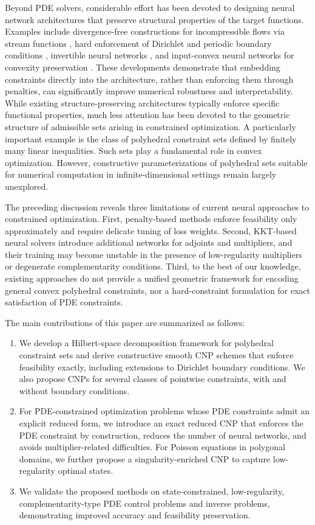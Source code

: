 \documentclass{article}
\numberwithin{equation}{section}
\begin{document}
Beyond PDE solvers, considerable effort has been devoted to designing neural network architectures that preserve structural properties of the target functions. Examples include divergence-free constructions for incompressible flows via stream functions \cite{raissi2019physics}, hard enforcement of Dirichlet and periodic boundary conditions \cite{lu2021physics}, invertible neural networks \cite{behrmann2019invertible}, and input-convex neural networks for convexity preservation \cite{amos2017input}. These developments demonstrate that embedding constraints directly into the architecture, rather than enforcing them through penalties, can significantly improve numerical robustness and interpretability. While existing structure-preserving architectures typically enforce specific functional properties, much less attention has been devoted to the geometric structure of admissible sets arising in constrained optimization. A particularly important example is the class of polyhedral constraint sets defined by finitely many linear inequalities. Such sets play a fundamental role in convex optimization. However, constructive parameterizations of polyhedral sets suitable for numerical computation in infinite-dimensional settings remain largely unexplored. 

The preceding discussion reveals three limitations of current neural approaches to constrained optimization. First, penalty-based methods enforce feasibility only approximately and require delicate tuning of loss weights. Second, KKT-based neural solvers introduce additional networks for adjoints and multipliers, and their training may become unstable in the presence of low-regularity multipliers or degenerate complementarity conditions. Third, to the best of our knowledge, existing approaches do not provide a unified geometric framework for encoding general convex polyhedral constraints, nor a hard-constraint formulation for exact satisfaction of PDE constraints.

The main contributions of this paper are summarized as follows:
\begin{enumerate}
\item We develop a Hilbert-space decomposition framework for polyhedral constraint sets and derive constructive smooth CNP schemes that enforce feasibility exactly, including extensions to Dirichlet boundary conditions. We also propose CNPs for several classes of pointwise constraints, with and without boundary conditions.

\item For PDE-constrained optimization problems whose PDE constraints admit an explicit reduced form, we introduce an exact reduced CNP that enforces the PDE constraint by construction, reduces the number of neural networks, and avoids multiplier-related difficulties. For Poisson equations in polygonal domains, we further propose a singularity-enriched CNP to capture low-regularity optimal states.

\item We validate the proposed methods on state-constrained, low-regularity, complementarity-type PDE control problems and inverse problems, demonstrating improved accuracy and feasibility preservation.
\end{enumerate}
\end{document}
